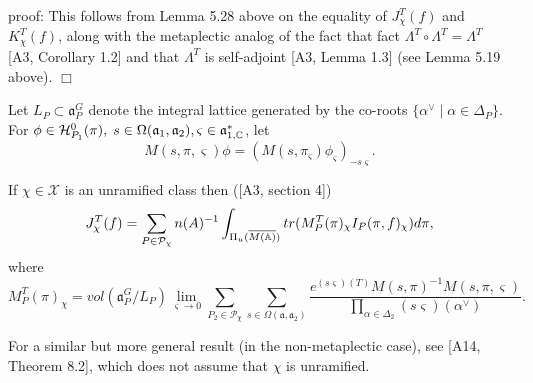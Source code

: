 proof: This follows from Lemma 5.28 above on the
equality of $J_\chi ^T(f)$ and $K_\chi ^T(f)$, along with the
metaplectic analog of the fact that
fact $\Lambda^T\circ \Lambda ^T=\Lambda ^T$
[A3, Corollary 1.2] and that $\Lambda ^T$ is
self-adjoint [A3, Lemma 1.3] (see Lemma 5.19 above). $\Box $

Let $L_P\subset {{\mathfrak{a}}}_P^G$ denote the integral
lattice generated by the
co-roots $\{\alpha ^{\vee }\;|\;\alpha \in \Delta _P\}$. For $\phi \in 
{\cal{H}}_{P_1}^0(\pi ),
\;s\in \Omega ({{\mathfrak{a}}}_1,{{\mathfrak{a}}}_2),\varsigma
\in {{\mathfrak{a}}}_{1,\mathbb{C}}^{*}$, let 
\[
M(s,\pi ,\varsigma )\phi =(M(s,\pi _\varsigma )\phi _\varsigma
)_{-s\varsigma }. 
\]
\begin{theorem}
If $\chi \in \mathcal{X}$ is an unramified class then ([A3, section 4]) 
\[
J_\chi ^T(f)=\sum_{P\in \mathcal{P}_\chi }
n(A)^{-1}\int_{\Pi _u(\overline{M(\mathbb{A} )})}
tr(M_P^T(\pi )_\chi I_P(\pi ,f)_\chi )d\pi ,
\]
where 
\[
M_P^T(\pi )_\chi =vol({{\mathfrak{a}}}_P^G/L_P)\lim_{\varsigma \rightarrow
0}\sum_{P_2\in \mathcal{P}_\chi }
\sum_{s\in \Omega ({{\mathfrak{a}}},{{\mathfrak{a}}}_2)}
\frac{e^{(s\varsigma )(T)}M(s,\pi )^{-1}M(s,\pi ,\varsigma )}{\prod_{\alpha
\in \Delta _2}(s\varsigma )(\alpha ^{\vee })}.
\]
\end{theorem}

For a similar but more general result (in the non-metaplectic case),
see [A14, Theorem 8.2], which does not assume that $\chi$ is unramified.

